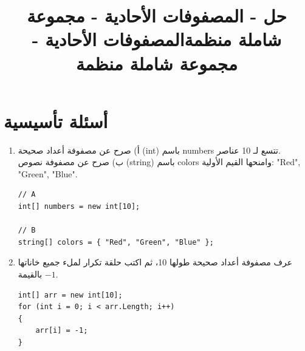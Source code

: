 \documentclass[14pt]{extarticle}
\title{حل - المصفوفات الأحادية - مجموعة شاملة منظمة}
\title{المصفوفات الأحادية - مجموعة شاملة منظمة}
\begin{document}
\maketitle
\thispagestyle{fancy}

\tableofcontents
\clearpage

\section{أسئلة تأسيسية}

\begin{enumerate}[itemsep=2em]

    \item
    أ) صرح عن مصفوفة أعداد صحيحة (\textenglish{int}) باسم \textenglish{numbers} تتسع لـ 10 عناصر.\\
    ب) صرح عن مصفوفة نصوص (\textenglish{string}) باسم \textenglish{colors} وامنحها القيم الأولية: \textenglish{"Red", "Green", "Blue"}.
    \ifwithsols
    \begin{boxSolution}
    \begin{english}
    \begin{verbatim}
// A
int[] numbers = new int[10];

// B
string[] colors = { "Red", "Green", "Blue" };
    \end{verbatim}
    \end{english}
    \end{boxSolution}
    \fi

    \item
    عرف مصفوفة أعداد صحيحة طولها 10، ثم اكتب حلقة تكرار لملء جميع خاناتها بالقيمة $-1$.
    \ifwithsols
    \begin{boxSolution}
    \begin{english}
    \begin{verbatim}
int[] arr = new int[10];
for (int i = 0; i < arr.Length; i++)
{
    arr[i] = -1;
}
    \end{verbatim}
    \end{english}
    \end{boxSolution}
    \fi


\end{enumerate}
\end{document}
